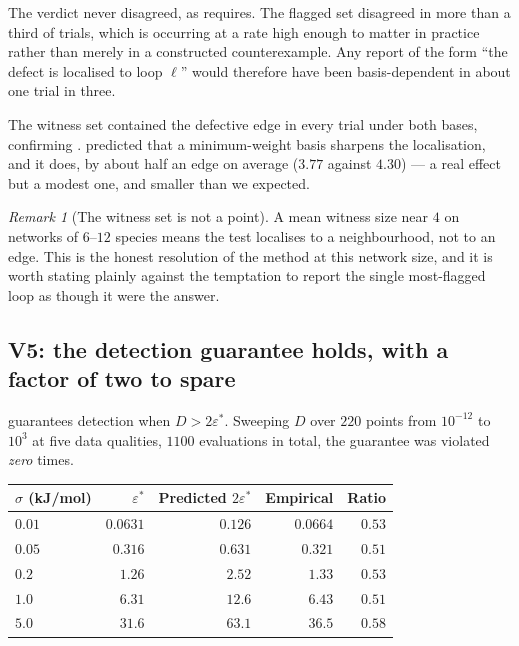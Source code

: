 \documentclass[11pt,twocolumn,a4paper]{article}
\theoremstyle{pstyle}
\theoremstyle{definition}
\theoremstyle{remark}
\newtheorem{remark}[theorem]{Remark}
\newcommand{\eps}{\varepsilon}
\newcommand{\epsstar}{\eps^{\ast}}
\begin{document}
The verdict never disagreed, as  requires. The
flagged set disagreed in more than a third of trials, which is
 occurring at a rate high enough to matter
in practice rather than merely in a constructed counterexample. Any
report of the form ``the defect is localised to loop $\ell$'' would
therefore have been basis-dependent in about one trial in three.

The witness set contained the defective edge in every trial under both
bases, confirming .  predicted
that a minimum-weight basis sharpens the localisation, and it does, by
about half an edge on average ($3.77$ against $4.30$) --- a real effect
but a modest one, and smaller than we expected.

\begin{remark}[The witness set is not a point]
\label{rem:witness-not-point}
A mean witness size near $4$ on networks of $6$--$12$ species means the
test localises to a neighbourhood, not to an edge. This is the honest
resolution of the method at this network size, and it is worth stating
plainly against the temptation to report the single most-flagged loop as
though it were the answer.
\end{remark}

\subsection{V5: the detection guarantee holds, with a factor of two to spare}

 guarantees detection when $D>2\epsstar$. Sweeping
$D$ over $220$ points from $10^{-12}$ to $10^{3}$ at five data
qualities, $1100$ evaluations in total, the guarantee was violated
\emph{zero} times.

\begin{center}\small
\begin{tabular}{@{}lrrrr@{}}
\toprule
$\sigma$ (kJ/mol) & $\epsstar$ & Predicted $2\epsstar$ &
Empirical & Ratio\\
\midrule
$0.01$ & $0.0631$ & $0.126$ & $0.0664$ & $0.53$\\
$0.05$ & $0.316$  & $0.631$ & $0.321$  & $0.51$\\
$0.2$  & $1.26$   & $2.52$  & $1.33$   & $0.53$\\
$1.0$  & $6.31$   & $12.6$  & $6.43$   & $0.51$\\
$5.0$  & $31.6$   & $63.1$  & $36.5$   & $0.58$\\
\bottomrule
\end{tabular}
\end{center}
\end{document}
